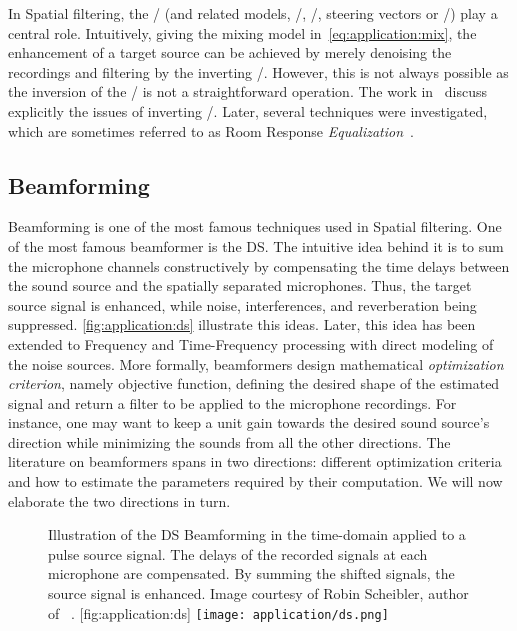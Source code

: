 \mynewline
In Spatial filtering, the \RIRs/ (and related models, \eg/, \RTFs/, steering vectors or \ReTFs/) play a central role.
Intuitively, giving the mixing model in~\cref{eq:application:mix}, the enhancement of a target source can be achieved by merely denoising the recordings and filtering by the inverting \RIRs/.
However, this is not always possible as the inversion of the \RIRs/ is not a straightforward operation.
The work in~ discuss explicitly the issues of inverting \RIRs/.
Later, several techniques were investigated, which are sometimes referred to as Room Response \textit{Equalization}~.


\subsection{Beamforming}
Beamforming is one of the most famous techniques used in Spatial filtering.
One of the most famous beamformer is the \ac{DS}.
The intuitive idea behind it is to sum the microphone channels constructively by compensating the time delays between the sound source and the spatially separated microphones.
Thus, the target source signal is enhanced, while noise, interferences, and reverberation being suppressed.
\cref{fig:application:ds} illustrate this ideas.
Later, this idea has been extended to Frequency and Time-Frequency processing with direct modeling of the noise sources.
More formally, beamformers design mathematical \textit{optimization criterion}, namely objective function, defining the desired shape of the estimated signal and return a filter to be applied to the microphone recordings.
For instance, one may want to keep a unit gain towards the desired sound source's direction while minimizing the sounds from all the other directions.
The literature on beamformers spans in two directions: different optimization criteria and how to estimate the parameters required by their computation.
We will now elaborate the two directions in turn.
\begin{figure}
    \begin{sidecaption}[]{
        Illustration of the \ac{DS} Beamforming in the time-domain applied to a pulse source signal.
        The delays of the recorded signals at each microphone are compensated.
        By summing the shifted signals, the source signal is enhanced.
        Image courtesy of Robin Scheibler, author of ~.
    }[fig:application:ds]
        \centering
        \texttt{[image: application/ds.png]}
    \end{sidecaption}
\end{figure}


